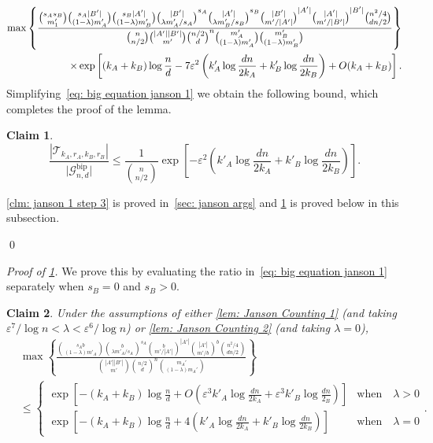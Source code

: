 \documentclass[11pt]{article}
\newcommand{\eps}{\varepsilon}
\theoremstyle{plain}
\newtheorem{claim}{Claim}[thm]
\begin{document}
\begin{align}
     \max\left\{\frac{\binom{s_As_B}{m'_1}\binom{s_A|B'|}{(1 - \lambda )m'_A}\binom{s_B|A'|}{(1 - \lambda )m'_B}\binom{|B'|}{\lambda m'_A/s_A}^{s_A}\binom{|A'|}{\lambda m'_B/s_B}^{s_B}\binom{|B'|}{m'/|A'|}^{|A'|}\binom{|A'|}{m'/|B'|}^{|B'|}\binom{n^2/4}{dn/2}}                {\binom{n}{n/2}\binom{|A'||B'|}{m'}\binom{n/2}{d}^{n}\binom{m_A'}{(1 - \lambda )m_A'}\binom{m'_B}{(1 - \lambda )m'_B}}\right\}\notag\\\times\exp\left[(k_A + k_B)\log\frac{n}{d} -7\varepsilon^2\left(k'_A\log\frac{dn}{2k_A} + k'_B\log\frac{dn}{2k_B}\right) + O(k_A + k_B)\right].\label{eq: big equation janson 1}
\end{align}
Simplifying~\eqref{eq: big equation janson 1} we obtain the following bound, which completes the proof of the lemma.
\begin{claim}\label{clm: final counting janson 1}
    \[
        \frac{|\mathcal T_{k_A, r_A, k_B, r_B}|}{\mathcal |\mathcal G_{n,d}^\text{bip}|} \leq\frac{1}{\binom{n}{n/2}}\exp\left[-\varepsilon^{2}\left(k'_A \log\frac{dn}{2k_A} + k'_B \log\frac{dn}{2k_B}\right)\right].
    \]
\end{claim}
\cref{clm: janson 1 step 3} is proved in~\cref{sec: janson args} and \cref{clm: final counting janson 1} is proved below in this subsection.

 \qed

\medskip
\noindent\textit{Proof of \cref{clm: final counting janson 1}.}
We prove this by evaluating the ratio in~\eqref{eq: big equation janson 1} separately when $s_B = 0$ and $s_B > 0$. 

\begin{claim}\label{clm: s_B = 0}
    Under the assumptions of either \cref{lem: Janson Counting 1} (and taking $\eps^7/\log n < \lambda < 
    \eps^6/\log n$) or \cref{lem: Janson Counting 2} (and taking $\lambda = 0$), 
    \begin{align*}
        &\max\left\{\frac{\binom{s_Ab}{(1 - \lambda )m'_A}\binom{b}{\lambda m'_A/s_A}^{s_A}\binom{b}{m'/|A'|}^{|A'|}\binom{|A'|}{m'/b}^{b}\binom{n^2/4}{dn/2}}                {\binom{|A'||B'|}{m'}\binom{n/2}{d}^{n}\binom{m_A'}{(1 - \lambda )m_A'}}\right\}\\
        &\leq\begin{cases}
            \exp\left[-(k_A + k_B)\log\frac{n}{d} + O\left(\eps^3k'_A\log\frac{dn}{2k_A} + \eps^3k'_B\log\frac{dn}{2_B}\right)\right] &\text{when}\quad \lambda > 0\\
            \exp\left[-(k_A + k_B)\log\frac{n}{d} + 4\left(k'_A\log\frac{dn}{2k_A} + k'_B\log\frac{dn}{2k_B}\right)\right] & \text{when} \quad \lambda = 0
        \end{cases} .
    \end{align*}
\end{claim}
\end{document}
